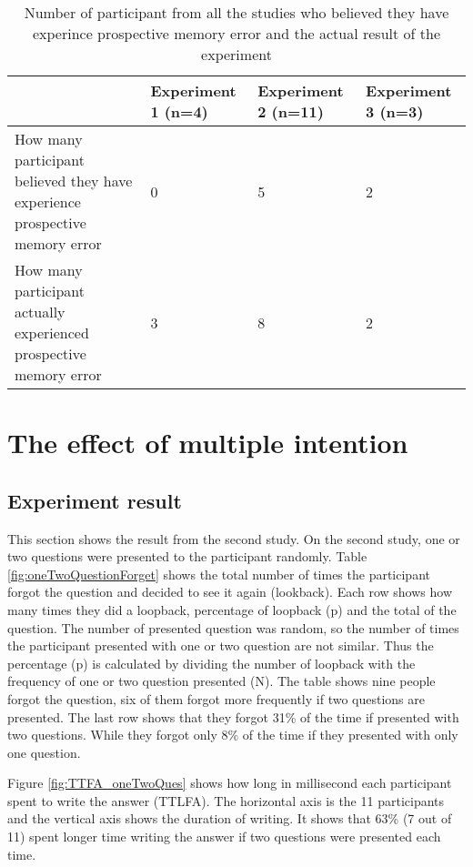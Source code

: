 \begin{table}[]
\centering
\small
\footnotesize
\begin{tabu}{|X[6,l]|X[2,c]|X[2,c]|X[2,c]|}
\hline
                                                                           & Experiment 1 (n=4) & Experiment 2 (n=11) & Experiment 3 (n=3) \\ \hline
How many participant believed they have experience prospective memory error & 0                  & 5                   & 2                  \\ \hline
How many participant actually experienced prospective memory error          & 3                  & 8                   & 2                  \\ \hline
\end{tabu}
\caption{Number of participant from all the studies who believed they have experince prospective memory error and the actual result of the experiment}
\label{fig:affirmationTable}
\end{table}



\section{The effect of multiple intention}

\subsection{Experiment result}
This section shows the result from the second study. On the second study, one or two questions were presented to the participant randomly.
Table \ref{fig:oneTwoQuestionForget} shows the total number of times the participant forgot the question and decided to see it again (lookback).
Each row shows how many times they did a loopback, percentage of loopback (p) and the total of the question.
The number of presented question was random, so the number of times the participant presented with
one or two question are not similar. Thus the percentage (p) is calculated by dividing the number of loopback with the frequency of one or two question
presented (N).
The table shows nine people forgot the question, six of them forgot more frequently if two questions are presented.
The last row shows that they forgot 31\% of the time if presented with two questions.
While they forgot only 8\% of the time if they presented with only one question.

Figure \ref{fig:TTFA_oneTwoQues} shows how long in millisecond each participant spent to write the answer (TTLFA).
The horizontal axis is the 11 participants and the vertical axis shows the duration of writing.
 It shows that 63\% (7 out of 11) spent longer time writing the answer if two questions were presented each time.

